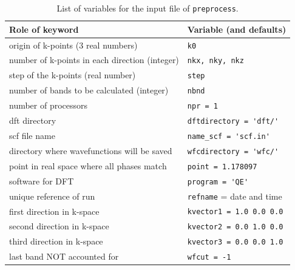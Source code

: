 \documentclass[a4paper,12pt]{report}
\begin{document}
\begin{table}[h]
 \centering
 \caption{List of variables for the input file of \texttt{preprocess}.}

 \begin{tabularx}{\textwidth}{Xl}
 \textbf{Role of keyword}                     & \textbf{Variable (and defaults)}\\
\hline
 origin of k-points (3 real numbers)           & \verb|k0| \\
 number of k-points in each direction (integer)& \verb|nkx, nky, nkz| \\
 step of the k-points (real number)            & \verb|step| \\
 number of bands to be calculated (integer)    & \verb|nbnd| \\
 \hline
 number of processors                         & \verb|npr = 1| \\
 dft directory                                & \verb|dftdirectory = 'dft/'| \\
 scf file name                                & \verb|name_scf = 'scf.in'| \\
 directory where wavefunctions will be saved  & \verb|wfcdirectory = 'wfc/'| \\
 point in real space where all phases match   & \verb|point = 1.178097| \\
 software for DFT                             & \verb|program = 'QE'| \\
 unique reference of run                      & \verb|refname| = date and time \\
 first direction in k-space                   & \verb|kvector1 = 1.0 0.0 0.0| \\
 second direction in k-space                  & \verb|kvector2 = 0.0 1.0 0.0| \\
 third direction in k-space                   & \verb|kvector3 = 0.0 0.0 1.0| \\
 last band NOT accounted for                  & \verb|wfcut = -1| \\


 \hline
\end{tabularx}
 \label{tab:variables_preprocessing}
\end{table}
\end{document}
